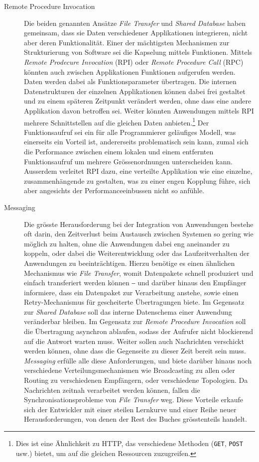 \begin{description}
    \item[Remote Procedure Invocation] Die beiden genannten Ansätze \textit{File Transfer} und \textit{Shared Database} haben gemeinsam, dass sie Daten verschiedener Applikationen integrieren, nicht aber deren Funktionalität. \cite[S. 49]{enterprise-integration-patterns} Einer der mächtigsten Mechanismen zur Strukturierung von Software sei die Kapselung mittels Funktionen. Mittels \textit{Remote Prodecure Invocation} (RPI) oder \textit{Remote Procedure Call} (RPC) könnten auch zwischen Applikationen Funktionen aufgerufen werden. Daten werden dabei als Funktionsparameter übertragen. Die internen Datenstrukturen der einzelnen Applikationen können dabei frei gestaltet und zu einem späteren Zeitpunkt verändert werden, ohne dass eine andere Applikation davon betroffen sei. Weiter könnten Anwendungen mittels RPI mehrere Schnittstellen auf die gleichen Daten anbieten.\footnote{Dies ist eine Ähnlichkeit zu HTTP, das verschiedene Methoden (\texttt{GET}, \texttt{POST} usw.) bietet, um auf die gleichen Ressourcen zuzugreifen.} Der Funktionsaufruf sei ein für alle Programmierer geläufiges Modell, was einerseits ein Vorteil ist, andererseits problematisch sein kann, zumal sich die Performance zwischen einem lokalen und einem entfernten Funktionsaufruf um mehrere Grössenordnungen unterscheiden kann. Ausserdem verleitet RPI dazu, eine verteilte Applikation wie eine einzelne, zusammenhängende zu gestalten, was zu einer engen Kopplung führe, sich aber angesichts der Performanceeinbussen nicht so anfühle. \cite[S. 50-52]{enterprise-integration-patterns}
    \item[Messaging] Die grösste Herausforderung bei der Integration von Anwendungen bestehe oft darin, den Zeitverlust beim Austausch zwischen Systemen so gering wie möglich zu halten, ohne die Anwendungen dabei eng aneinander zu koppeln, oder dabei die Weiterentwicklung oder das Laufzeitverhalten der Anwendungen zu beeinträchtigen. Hierzu benötige es einen ähnlichen Mechanismus wie \textit{File Transfer}, womit Datenpakete schnell produziert und einfach transferiert werden können ‒ und darüber hinaus den Empfänger informiere, dass ein Datenpaket zur Verarbeitung anstehe, sowie einen Retry-Mechanismus für gescheiterte Übertragungen biete. Im Gegensatz zur \textit{Shared Database} soll das interne Datenschema einer Anwendung veränderbar bleiben. Im Gegensatz zur \textit{Remote Procedure Invocation} soll die Übertragung asynchron ablaufen, sodass der Aufrufer nicht blockierend auf die Antwort warten muss. Weiter sollen auch Nachrichten verschickt werden können, ohne dass die Gegenseite zu dieser Zeit bereit sein muss. \textit{Messaging} erfülle alle diese Anforderungen, und biete darüber hinaus noch verschiedene Verteilungsmechanismen wie Broadcasting zu allen oder Routing zu verschiedenen Empfängern, oder verschiedene Topologien. Da Nachrichten zeitnah verarbeitet werden können, fallen die Synchronisationsprobleme von \textit{File Transfer} weg. Diese Vorteile erkaufe sich der Entwickler mit einer steilen Lernkurve und einer Reihe neuer Herausforderungen, von denen der Rest des Buches grösstenteils handelt. \cite[S. 53-59]{enterprise-integration-patterns}
\end{description}

